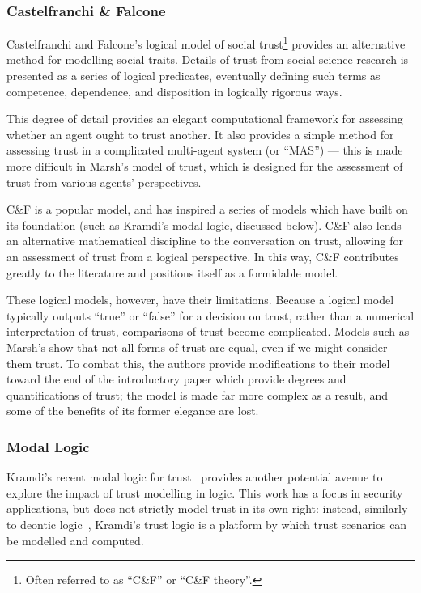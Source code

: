 \documentclass[11pt,english,twocolumn]{article}
\begin{document}
\subsubsection{Castelfranchi \& Falcone}
Castelfranchi and Falcone's logical model of social trust\cite{Castelfranchi2001}\footnote{Often referred to as ``C\&F'' or ``C\&F theory''.} provides an alternative method for modelling social traits. Details of trust from social science research is presented as a series of logical predicates, eventually defining such terms as competence, dependence, and disposition in logically rigorous ways.\par

This degree of detail provides an elegant computational framework for assessing whether an agent ought to trust another. It also provides a simple method for assessing trust in a complicated multi-agent system (or ``MAS'') --- this is made more difficult in Marsh's model of trust, which is designed for the assessment of trust from various agents' perspectives.\par

C\&F is a popular model, and has inspired a series of models which have built on its foundation (such as Kramdi's modal logic\cite{Kramdi}, discussed below). C\&F also lends an alternative mathematical discipline to the conversation on trust, allowing for an assessment of trust from a logical perspective. In this way, C\&F contributes greatly to the literature and positions itself as a formidable model.\par

These logical models, however, have their limitations.  Because a logical model typically outputs ``true'' or ``false'' for a decision on trust, rather than a numerical interpretation of trust, comparisons of trust become complicated. Models such as Marsh's show that not all forms of trust are equal, even if we might consider them trust. To combat this, the authors provide modifications to their model toward the end of the introductory paper which provide degrees and quantifications of trust; the model is made far more complex as a result, and some of the benefits of its former elegance are lost.\par


\subsubsection{Modal Logic}
Kramdi's recent modal logic for trust~\cite{Kramdi} provides another potential avenue to explore the impact of trust modelling in logic. This work has a focus in security applications, but does not strictly model trust in its own right: instead, similarly to deontic logic~\cite{deontic-logic}, Kramdi's trust logic is a platform by which trust scenarios can be modelled and computed.\par 
\end{document}
